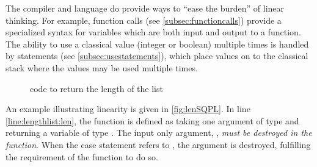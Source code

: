 The compiler and language do
 provide ways to ``ease the burden'' of linear thinking. 
For example, function calls (see \vref{subsec:functioncalls}) 
provide a specialized syntax for variables
which are both input and output to a function. The ability to use
a classical value (integer or boolean) multiple times is handled by  
 statements (see \vref{subsec:usestatements}), which place values on to the
classical stack where the values may be used multiple times.

\begin{figure}[htbp]

\caption{\lqpl{} code to return the length of the list}\label{fig:lenSQPL}
\end{figure}

An example illustrating linearity is given in \vref{fig:lenSQPL}. In
line \ref{line:lengthlist:len}, the function  is defined
as taking one argument of type  and returning
a variable of type . The input only argument, ,
\emph{must be destroyed in the function}. When the
case statement refers to , the argument is 
destroyed, fulfilling the requirement of the function to do so.



